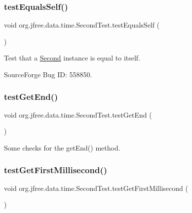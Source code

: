 \subsubsection{\texorpdfstring{test\+Equals\+Self()}{testEqualsSelf()}}
{\footnotesize\ttfamily void org.\+jfree.\+data.\+time.\+Second\+Test.\+test\+Equals\+Self (\begin{DoxyParamCaption}{ }\end{DoxyParamCaption})}

Test that a \mbox{\hyperlink{classorg_1_1jfree_1_1data_1_1time_1_1_second}{Second}} instance is equal to itself.

Source\+Forge Bug ID\+: 558850. \mbox{\label{classorg_1_1jfree_1_1data_1_1time_1_1_second_test_a7f1867d4124a1ecf308e35644a6e35e6}} 
\subsubsection{\texorpdfstring{test\+Get\+End()}{testGetEnd()}}
{\footnotesize\ttfamily void org.\+jfree.\+data.\+time.\+Second\+Test.\+test\+Get\+End (\begin{DoxyParamCaption}{ }\end{DoxyParamCaption})}

Some checks for the get\+End() method. \mbox{\label{classorg_1_1jfree_1_1data_1_1time_1_1_second_test_a0ed126157dd9b24e488af3d02446474d}} 
\subsubsection{\texorpdfstring{test\+Get\+First\+Millisecond()}{testGetFirstMillisecond()}}
{\footnotesize\ttfamily void org.\+jfree.\+data.\+time.\+Second\+Test.\+test\+Get\+First\+Millisecond (\begin{DoxyParamCaption}{ }\end{DoxyParamCaption})}

